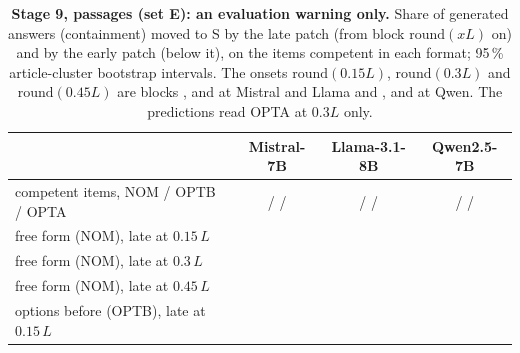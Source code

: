 \begin{table}[!htbp]
\centering
\footnotesize
\caption{\textbf{Stage 9, passages (set E): an evaluation warning only.} Share of generated answers (containment) moved to S by the late patch (from block $\mathrm{round}(xL)$ on) and by the early patch (below it), on the items competent in each format; 95\,\% article-cluster bootstrap intervals. The onsets $\mathrm{round}(0.15L)$, $\mathrm{round}(0.3L)$ and $\mathrm{round}(0.45L)$ are blocks \NqPsgOnsetFifteenMistralSeven{}, \NqPsgOnsetThirtyMistralSeven{} and \NqPsgOnsetFortyfiveMistralSeven{} at Mistral and Llama and \NqPsgOnsetFifteenQwenSeven{}, \NqPsgOnsetThirtyQwenSeven{} and \NqPsgOnsetFortyfiveQwenSeven{} at Qwen. The predictions read OPTA at $0.3L$ only.}
\label{tab:s9passages}
\setlength{\tabcolsep}{5pt}
\begin{tabular}{@{}lccc@{}}
\toprule
 & Mistral-7B & Llama-3.1-8B & Qwen2.5-7B \\
\midrule
competent items, NOM / OPTB / OPTA & \NqPsgNNomMistralSeven{} / \NqPsgNOptbMistralSeven{} / \NqPsgNOptaMistralSeven{} & \NqPsgNNomLlamaEight{} / \NqPsgNOptbLlamaEight{} / \NqPsgNOptaLlamaEight{} & \NqPsgNNomQwenSeven{} / \NqPsgNOptbQwenSeven{} / \NqPsgNOptaQwenSeven{} \\
\addlinespace
free form (NOM), late at $0.15\,L$ & \SnineCI{\NqPsgLateNomFifteenMistralSeven}{\NqPsgLateNomFifteenMistralSevenLo}{\NqPsgLateNomFifteenMistralSevenHi} & \SnineCI{\NqPsgLateNomFifteenLlamaEight}{\NqPsgLateNomFifteenLlamaEightLo}{\NqPsgLateNomFifteenLlamaEightHi} & \SnineCI{\NqPsgLateNomFifteenQwenSeven}{\NqPsgLateNomFifteenQwenSevenLo}{\NqPsgLateNomFifteenQwenSevenHi} \\
free form (NOM), late at $0.3\,L$ & \SnineCI{\NqPsgLateNomThirtyMistralSeven}{\NqPsgLateNomThirtyMistralSevenLo}{\NqPsgLateNomThirtyMistralSevenHi} & \SnineCI{\NqPsgLateNomThirtyLlamaEight}{\NqPsgLateNomThirtyLlamaEightLo}{\NqPsgLateNomThirtyLlamaEightHi} & \SnineCI{\NqPsgLateNomThirtyQwenSeven}{\NqPsgLateNomThirtyQwenSevenLo}{\NqPsgLateNomThirtyQwenSevenHi} \\
free form (NOM), late at $0.45\,L$ & \SnineCI{\NqPsgLateNomFortyfiveMistralSeven}{\NqPsgLateNomFortyfiveMistralSevenLo}{\NqPsgLateNomFortyfiveMistralSevenHi} & \SnineCI{\NqPsgLateNomFortyfiveLlamaEight}{\NqPsgLateNomFortyfiveLlamaEightLo}{\NqPsgLateNomFortyfiveLlamaEightHi} & \SnineCI{\NqPsgLateNomFortyfiveQwenSeven}{\NqPsgLateNomFortyfiveQwenSevenLo}{\NqPsgLateNomFortyfiveQwenSevenHi} \\
options before (OPTB), late at $0.15\,L$ & \SnineCI{\NqPsgLateOptbFifteenMistralSeven}{\NqPsgLateOptbFifteenMistralSevenLo}{\NqPsgLateOptbFifteenMistralSevenHi} & \SnineCI{\NqPsgLateOptbFifteenLlamaEight}{\NqPsgLateOptbFifteenLlamaEightLo}{\NqPsgLateOptbFifteenLlamaEightHi} & \SnineCI{\NqPsgLateOptbFifteenQwenSeven}{\NqPsgLateOptbFifteenQwenSevenLo}{\NqPsgLateOptbFifteenQwenSevenHi} \\

\end{tabular}
\end{table}
